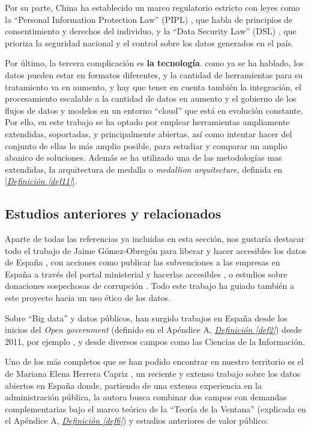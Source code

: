 Por su parte, China ha establecido un marco regulatorio estricto con leyes como la ``Personal Information Protection Law'' (PIPL) \citep{webPIPL2021China}, que habla de principios de consentimiento y derechos del individuo, y la ``Data Security Law'' (DSL) \citep{webDSL2021China}, que prioriza la seguridad nacional y el control sobre los datos generados en el país.

Por último, la tercera complicación es \textbf{la tecnología}. como ya se ha hablado, los datos pueden estar en formatos diferentes, y la cantidad de herramientas para su tratamiento va en aumento, y hay que tener en cuenta también la integración, el procesamiento escalable a la cantidad de datos en aumento y el gobierno de los flujos de datos y modelos en un entorno ``cloud'' que está en evolución constante. Por ello, en este trabajo se ha optado por emplear herramientas ampliamente extendidas, soportadas, y principalmente abiertas, así como intentar hacer del conjunto de ellas lo más amplio posible, para estudiar y comparar un amplio abanico de soluciones. Además se ha utilizado una de las metodologías mas extendidas, la arquitectura de medalla o \textit{medallion arquitecture}, definida en  \hyperref[def11]{[\textit{Definición \ref*{def11}}]}. \\

\subsection{Estudios anteriores y relacionados}

Aparte de todas las referencias ya incluidas en esta sección, nos gustaría destacar todo el trabajo de Jaime Gómez-Obregón para liberar y hacer accesibles los datos de España \citep{JaimeGomezObregon}, con acciones como publicar las subvenciones a las empresas en España a través del portal ministerial y hacerlas accesibles \citep{JaimeGomezObregonSubvenciones}, o estudios sobre donaciones sospechosas de corrupción \citep{JaimeGomezObregonDonacion}. Todo este trabajo ha guiado también a este proyecto hacia un uso ético de los datos.

Sobre ``Big data'' y datos públicos, han surgido trabajos en España desde los inicios del \textit{Open government} (definido en el Apéndice A, \hyperref[def2]{\textit{Definición \ref*{def2}}}) desde 2011, por ejemplo \citep{OperGovernment2011}, y desde diversos campos como las Ciencias de la Información. 

Uno de los más completos que se han podido encontrar en nuestro territorio es el de Mariana Elena Herrera Capriz \citep{HerreraCapriz2024}, un reciente y extenso trabajo sobre los datos abiertos en España donde, partiendo de una extensa experiencia en la administración pública, la autora busca combinar dos campos con demandas complementarias bajo el marco teórico de la ``Teoría de la Ventana'' (explicada en el Apéndice A, \hyperref[def6]{\textit{Definición \ref*{def6}}}) y estudios anteriores de valor público:

